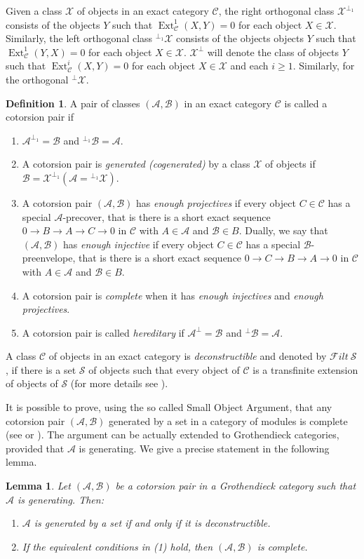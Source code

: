\documentclass[11pt,a4paper,reqno]{amsart}
\newcommand{\Ext}{\operatorname{Ext}}
\newcommand{\A}{\mathcal{A}}
\newcommand{\B}{\mathcal{B}}
\newcommand{\C}{\mathcal{C}}
\newcommand{\F}{\mathcal{F}}
\newcommand{\clS}{\mathcal{S}}
\newcommand{\X}{\mathcal{X}}
\theoremstyle{plain}
\newtheorem{lem}[thm]{Lemma}
\theoremstyle{definition}
\newtheorem{defn}[thm]{Definition}
\theoremstyle{remark}
\begin{document}
Given a class $\X$ of objects in an exact category $\C$, the right orthogonal class $\X^{\perp_1}$ consists of the objects $Y$ such that $\Ext^1_{\C}(X,Y)=0$ for each object $X\in \X$. Similarly, the left orthogonal class $^{\perp_1}\X $ consists of the objects objects $Y$ such that $\Ext^1_{\C}(Y,X)=0$ for each object $X\in \X$.
$\X^\perp$ will denote the class of objects $Y$ such that $\Ext^i_{\C}(X,Y)=0$ for each object $X\in \X$ and each $i\geq 1$. Similarly, for the orthogonal $^\perp\X $.
%
\begin{defn}\label{D:cotorsion-pair} A pair of classes $(\A, \B)$ in an exact category $\C$ is called a cotorsion pair if
\begin{enumerate}
\item $\A^{\perp_1}=\B$ and $^{\perp_1} \B=\A$.
\item A cotorsion pair is \emph{generated (cogenerated)} by a class $\X$ of objects if $\B=\X^{\perp_1} (\A={^{\perp_1}\X})$.
\item A cotorsion pair $(\A, \B)$ has \emph{enough projectives} if every object $C\in \C$ has a special $\A$-precover, that is there is a short exact sequence $0\to B\to A\to C\to 0$ in $\C$ with $A\in \A$ and $\B\in B$. Dually, we say that  $(\A, \B)$ has \emph{enough injective} if every object $C\in \C$ has a special $\B$-preenvelope, that is there is a short exact sequence $0\to C\to B\to A\to 0$ in $\C$ with $A\in \A$ and $\B\in B$.
\item A cotorsion pair is \emph{complete} when it has \emph{enough injectives} and \emph{enough projectives}.
\item A cotorsion pair is called \emph{hereditary} if $\A^\perp=\B$ and $^{\perp} \B=\A$.
\end{enumerate}
\end{defn}
A class $\C$ of objects in an exact category is \emph{deconstructible} and denoted by $\F ilt\ \clS$, if there is a set $\clS$ of objects such that every object of $\C$ is a transfinite extension of objects of $\clS$ (for more details see \cite[Definition 3.7 and 3.10]{Sto13}).

It is possible to prove, using the so called Small Object Argument, that any cotorsion pair $(\A,\B)$ generated by a set in a category of modules is complete (see \cite{Q} or \cite{ET01}). The argument can be actually extended to Grothendieck categories, provided that $\A$ is generating. We give a precise statement in the following lemma.

\begin{lem}\label{lem1_2} Let $(\A,\B)$ be a cotorsion pair in a Grothendieck category such that $\A$ is generating. Then:
  \begin{enumerate}
    \item $\A$ is generated by a set if and only if it is deconstructible.
    \item If the equivalent conditions in (1) hold, then $(\A,\B)$ is complete.
  \end{enumerate}
\end{lem}
\end{document}
